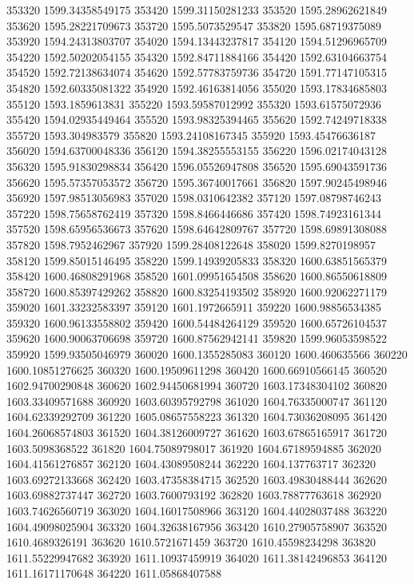 {353320 1599.34358549175
353420 1599.31150281233
353520 1595.28962621849
353620 1595.28221709673
353720 1595.5073529547
353820 1595.68719375089
353920 1594.24313803707
354020 1594.13443237817
354120 1594.51296965709
354220 1592.50202054155
354320 1592.84711884166
354420 1592.63104663754
354520 1592.72138634074
354620 1592.57783759736
354720 1591.77147105315
354820 1592.60335081322
354920 1592.46163814056
355020 1593.17834685803
355120 1593.1859613831
355220 1593.59587012992
355320 1593.61575072936
355420 1594.02935449464
355520 1593.98325394465
355620 1592.74249718338
355720 1593.304983579
355820 1593.24108167345
355920 1593.45476636187
356020 1594.63700048336
356120 1594.38255553155
356220 1596.02174043128
356320 1595.91830298834
356420 1596.05526947808
356520 1595.69043591736
356620 1595.57357053572
356720 1595.36740017661
356820 1597.90245498946
356920 1597.98513056983
357020 1598.0310642382
357120 1597.08798746243
357220 1598.75658762419
357320 1598.8466446686
357420 1598.74923161344
357520 1598.65956536673
357620 1598.64642809767
357720 1598.69891308088
357820 1598.7952462967
357920 1599.28408122648
358020 1599.8270198957
358120 1599.85015146495
358220 1599.14939205833
358320 1600.63851565379
358420 1600.46808291968
358520 1601.09951654508
358620 1600.86550618809
358720 1600.85397429262
358820 1600.83254193502
358920 1600.92062271179
359020 1601.33232583397
359120 1601.1972665911
359220 1600.98856534385
359320 1600.96133558802
359420 1600.54484264129
359520 1600.65726104537
359620 1600.90063706698
359720 1600.87562942141
359820 1599.96053598522
359920 1599.93505046979
360020 1600.1355285083
360120 1600.460635566
360220 1600.10851276625
360320 1600.19509611298
360420 1600.66910566145
360520 1602.94700290848
360620 1602.94450681994
360720 1603.17348304102
360820 1603.33409571688
360920 1603.60395792798
361020 1604.76335000747
361120 1604.62339292709
361220 1605.08657558223
361320 1604.73036208095
361420 1604.26068574803
361520 1604.38126009727
361620 1603.67865165917
361720 1603.5098368522
361820 1604.75089798017
361920 1604.67189594885
362020 1604.41561276857
362120 1604.43089508244
362220 1604.137763717
362320 1603.69272133668
362420 1603.47358384715
362520 1603.49830488444
362620 1603.69882737447
362720 1603.7600793192
362820 1603.78877763618
362920 1603.74626560719
363020 1604.16017508966
363120 1604.44028037488
363220 1604.49098025904
363320 1604.32638167956
363420 1610.27905758907
363520 1610.4689326191
363620 1610.5721671459
363720 1610.45598234298
363820 1611.55229947682
363920 1611.10937459919
364020 1611.38142496853
364120 1611.16171170648
364220 1611.05868407588
}
